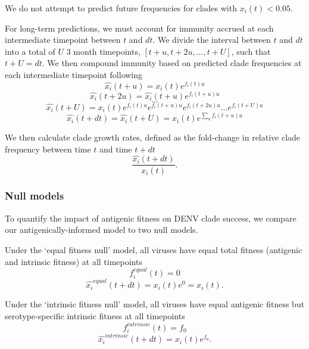 \documentclass[11pt,oneside,letterpaper]{article}
\begin{document}
We do not attempt to predict future frequencies for clades with $x_i(t) < 0.05$.

For long-term predictions, we must account for immunity accrued at each intermediate timepoint between $t$ and $dt$.
We divide the interval between $t$ and $dt$ into a total of $U$ 3 month timepoints, $[t+u, t+2u, ..., t+U]$, such that $t+U=dt$.
We then compound immunity based on predicted clade frequencies at each intermediate timepoint following
\begin{equation}
\hat{x_i}(t+u) = x_i(t)e^{f_i(t) u}
\end{equation}
\begin{equation}
\hat{x_i}(t+2u) = \hat{x_i}(t+u) e^{f_i(t+u)u}
\end{equation}
$$...$$
\begin{equation}
\hat{x_i}(t+U) = x_i(t) e^{f_i(t)u} e^{f_i(t+u)u} e^{f_i(t+2u)u} ... e^{f_i(t+U)u}
\end{equation}
\begin{equation}
  \label{eq_compounding_immunity}
\hat{x_i}(t+dt) = \hat{x_i}(t+U) = x_i(t) e^{\sum_{u}f_i(t+u)u}
\end{equation}

We then calculate clade growth rates, defined as the fold-change in relative clade frequency between time $t$ and time $t+dt$
\begin{equation}
  \label{eq_growth_rate}
\frac{\hat{x_i}(t+dt)}{x_i(t)}.
\end{equation}

\subsubsection*{Null models}
To quantify the impact of antigenic fitness on DENV clade success, we compare our antigenically-informed model to two null models.

Under the `equal fitness null' model, all viruses have equal total fitness (antigenic and intrinsic fitness) at all timepoints
\begin{equation}
  \label{equal_null}
f_i^{equal}(t) = 0
\end{equation}
\begin{equation}
\hat{x_i}^{equal}(t+dt) = x_i(t) e^0 = x_i(t).
\end{equation}

Under the `intrinsic fitness null' model, all viruses have equal antigenic fitness but serotype-specific intrinsic fitness at all timepoints
\begin{equation}
  \label{intrinsic_null}
  f_i^{intrinsic}(t) = f_0
\end{equation}
\begin{equation}
\hat{x_i}^{intrinsic}(t+dt) = x_i(t) e^{f_0}.
\end{equation}
\end{document}
